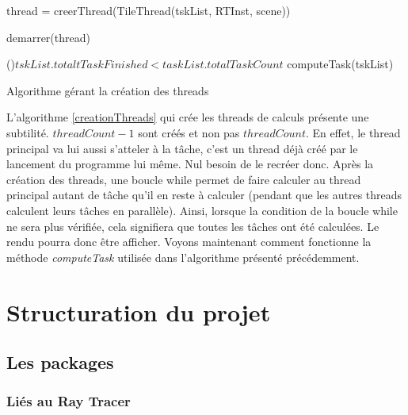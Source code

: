 \documentclass[11pt]{article}
\begin{document}
\begin{algorithm}[H]
	
	{
		thread = creerThread(TileThread(tskList, RTInst, scene))

		demarrer(thread)
	}

	\While(){$tskList.totaltTaskFinished < taskList.totalTaskCount$}
	{
		computeTask(tskList)
	}

	\caption{Algorithme gérant la création des threads}
	\label{creationThreads}
\end{algorithm}

L'algorithme \ref{creationThreads} qui crée les threads de calculs présente une subtilité. $threadCount-1$ sont créés et non pas $threadCount$. En effet, le thread principal va lui aussi s'atteler à la tâche, c'est un thread déjà créé par le lancement du programme lui même. Nul besoin de le recréer donc. Après la création des threads, une boucle while permet de faire calculer au thread principal autant de tâche qu'il en reste à calculer (pendant que les autres threads calculent leurs tâches en parallèle). Ainsi, lorsque la condition de la boucle while ne sera plus vérifiée, cela signifiera que toutes les tâches ont été calculées. Le rendu pourra donc être afficher. Voyons maintenant comment fonctionne la méthode \textit{computeTask} utilisée dans l'algorithme présenté précédemment.

\begin{algorithm}
	\KwIn{}

	
\end{algorithm}

\section{Structuration du projet}
\subsection{Les packages}
\subsubsection{Liés au Ray Tracer}
\end{document}

